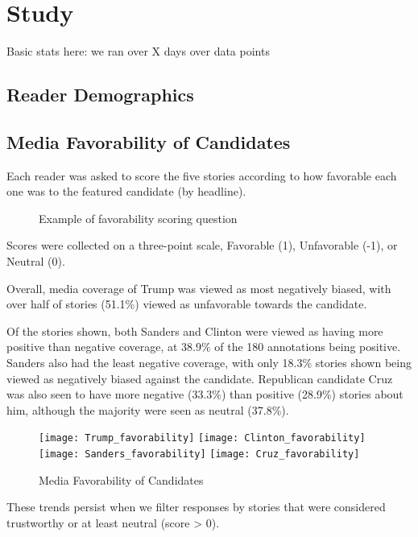 \chapter{Study}
Basic stats here:
we ran over X days
over data points

\section{Reader Demographics}

\section{Media Favorability of Candidates}
Each reader was asked to score the five stories according to how favorable each one was to the featured candidate (by headline). 

\begin{figure}[h!] 
\centering
  \caption{Example of favorability scoring question}
\end{figure}
 
Scores were collected on a three-point scale, Favorable (1), Unfavorable (-1), or Neutral (0).

Overall, media coverage of Trump was viewed as most negatively biased, with over half of stories (51.1\%) viewed as unfavorable towards the candidate.

Of the stories shown, both Sanders and Clinton were viewed as having more positive than negative coverage, at 38.9\% of the 180 annotations being positive. Sanders also had the least negative coverage, with only 18.3\% stories shown being viewed as negatively biased against the candidate. Republican candidate Cruz was also seen to have more negative (33.3\%) than positive (28.9\%) stories about him, although the majority were seen as neutral (37.8\%).

\begin{figure}[h!] 
\centering
  \texttt{[image: Trump\_favorability]} 
  \texttt{[image: Clinton\_favorability]} 
  \texttt{[image: Sanders\_favorability]} 
  \texttt{[image: Cruz\_favorability]} 
  \caption{Media Favorability of Candidates}
\end{figure}

These trends persist when we filter responses by stories that were considered trustworthy or at least neutral (score > 0).

